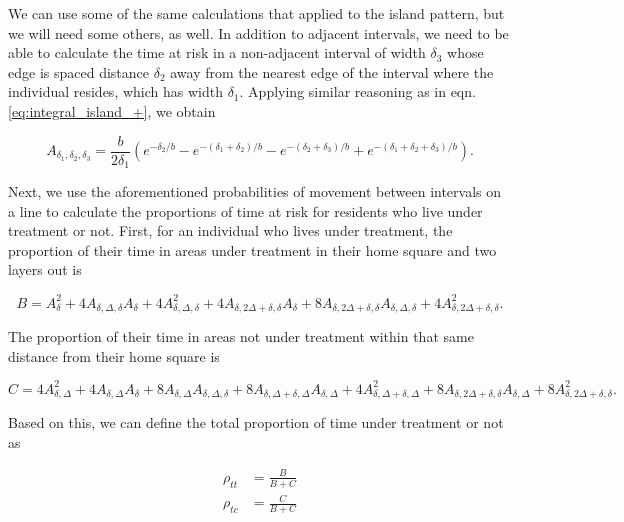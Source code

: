 \documentclass[11pt]{amsart}
\begin{document}
We can use some of the same calculations that applied to the island pattern, but we will need some others, as well. In addition to adjacent intervals, we need to be able to calculate the time at risk in a non-adjacent interval of width $\delta_3$ whose edge is spaced distance $\delta_2$ away from the nearest edge of the interval where the individual resides, which has width $\delta_1$. Applying similar reasoning as in eqn. \eqref{eq:integral_island_+}, we obtain

\begin{equation}
A_{\delta_1,\delta_2,\delta_3} = \frac{b}{2\delta_1} \left(e^{-\delta_2/b} - e^{-(\delta_1 +\delta_2)/b} - e^{-(\delta_2 +\delta_3)/b} + e^{-(\delta_1+\delta_2+\delta_3)/b} \right) .
\label{eq:Adelta123}
\end{equation}

Next, we use the aforementioned probabilities of movement between intervals on a line to calculate the proportions of time at risk for residents who live under treatment or not. First, for an individual who lives under treatment, the proportion of their time in areas under treatment in their home square and two layers out is

\begin{equation}
B = A_{\delta}^2 + 4 A_{\delta,\Delta,\delta}A_{\delta} + 4 A_{\delta,\Delta,\delta}^2 + 4 A_{\delta,2\Delta+\delta,\delta}A_{\delta} + 8 A_{\delta,2\Delta+\delta,\delta}A_{\delta,\Delta,\delta} + 4 A_{\delta,2\Delta+\delta,\delta}^2 .
\end{equation}

\noindent The proportion of their time in areas not under treatment within that same distance from their home square is

\begin{equation}
C = 
4 A_{\delta,\Delta}^2 + 4 A_{\delta,\Delta} A_\delta + 
8 A_{\delta,\Delta} A_{\delta,\Delta,\delta} +
8 A_{\delta,\Delta+\delta,\Delta} A_{\delta,\Delta} +
4 A_{\delta,\Delta+\delta,\Delta} ^ 2 +
8 A_{\delta,2\Delta+\delta,\delta} A_{\delta,\Delta} +
8 A_{\delta,2\Delta+\delta,\delta} ^ 2 .
\end{equation}

\noindent Based on this, we can define the total proportion of time under treatment or not as

\begin{align}
\rho_{tt} &= \frac{B}{B+C} \\
\rho_{tc} &= \frac{C}{B+C} 
\end{align}
\end{document}
